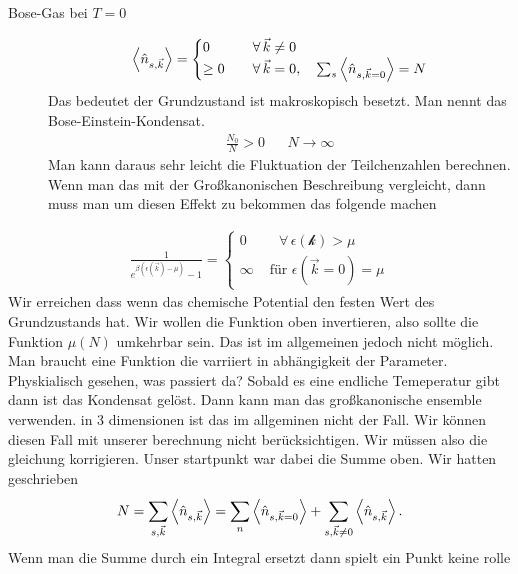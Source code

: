 \begin{description}
  \item[Bose-Gas bei $T=0$] 
    \begin{align*}
      \Braket{\hat{n}_{s,\vec{k}}} = \begin{cases}
        0 & \quad\forall\, \vec{k} \neq 0 \\
        \ge 0 & \quad\forall\, \vec{k} = 0 , \quad \sum_{s}^{} \Braket{\hat{n}_{s,\vec{k}=0}} = N
      \end{cases} 
    \end{align*}
    Das bedeutet der Grundzustand ist makroskopisch besetzt. Man nennt das
    Bose-Einstein-Kondensat. 
    \begin{align*}
      \frac{N_0}{N} > 0 && N \to \infty 
    \end{align*}
    Man kann daraus sehr leicht die Fluktuation der Teilchenzahlen berechnen.
    Wenn man das mit der Großkanonischen Beschreibung vergleicht, dann muss
    man um diesen Effekt zu bekommen das folgende machen
\end{description}
%
\begin{align*}
  \frac{1}{e^{\beta(\epsilon(\vec{k}) - \mu)} - 1} = \begin{cases}
    0 & \quad\forall\, \epsilon(\mathcal{k}) > \mu \\
    \infty & \text{ für } \epsilon(\vec{k} = 0) = \mu
  \end{cases} 
\end{align*}
%
Wir erreichen dass wenn das chemische Potential den festen Wert des Grundzustands
hat. Wir wollen die Funktion oben invertieren, also sollte die Funktion
$\mu(N)$ umkehrbar sein. Das ist im allgemeinen jedoch nicht möglich. Man braucht
eine Funktion die varriiert in abhängigkeit der Parameter. Physkialisch gesehen, 
was passiert da? Sobald es eine endliche Temeperatur gibt dann ist das Kondensat
gelöst. Dann kann man das großkanonische ensemble verwenden. in 3 dimensionen
ist das im allgeminen nicht der Fall. Wir können diesen Fall mit unserer berechnung
nicht berücksichtigen. Wir müssen also die gleichung korrigieren. Unser 
startpunkt war dabei die Summe oben. Wir hatten geschrieben
%
\begin{align*}
  N = \sum_{s, \vec{k}}^{} \Braket{\hat{n}_{s,\vec{k}}} = \sum_{n}^{} \Braket{\hat{n}_{s,\vec{k}=0}}
  + \sum_{s, \vec{k} \neq 0 }^{} \Braket{\hat{n}_{s,\vec{k}}}.
\end{align*}
%
Wenn man die Summe durch ein Integral ersetzt dann spielt ein Punkt keine rolle
